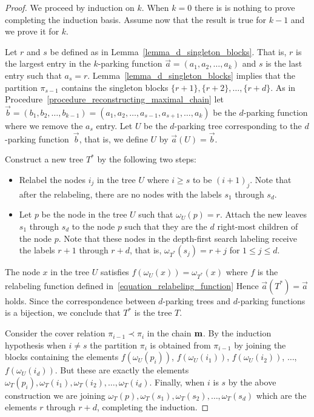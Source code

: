 \documentclass[11pt]{amsart}
\numberwithin{equation}{section}
\newcommand{\coveredby}{\prec}
\begin{document}
\begin{proof}
We proceed by induction on $k$.
When $k=0$ there is is nothing to prove completing the induction basis.
Assume now that the result is true for $k-1$ and we prove it for $k$.


Let $r$ and $s$ be defined
as in Lemma~\ref{lemma_d_singleton_blocks}.
That is, $r$ is the largest entry in the $k$-parking function $\vec{a} = (a_{1},a_{2}, \ldots, a_{k})$
and $s$ is the last entry such that $a_{s} = r$.
Lemma~\ref{lemma_d_singleton_blocks} implies that
the partition $\pi_{s-1}$ contains the singleton blocks
$\{r+1\}, \{r+2\}, \ldots, \{r+d\}$.
As in Procedure~\ref{procedure_reconstructing_maximal_chain}
let $\vec{b} = (b_{1}, b_{2}, \ldots, b_{k-1}) = (a_{1}, a_{2}, \ldots, a_{s-1}, a_{s+1}, \ldots, a_{k})$
be the $d$-parking function where we remove the $a_{s}$ entry.
Let $U$ be the $d$-parking tree corresponding to the $d$-parking function~$\vec{b}$,
that is, we define $U$ by $\vec{a}(U) = \vec{b}$.



Construct a new tree $T^{*}$ by the following two steps:
\begin{itemize}
\item[(1)]
Relabel the nodes $i_{j}$ in the tree $U$ where $i \geq s$ to be $(i+1)_{j}$.
Note that after the relabeling, there are no nodes with the labels $s_{1}$ through $s_{d}$.
\item[(2)]
Let $p$ be the node in the tree $U$ such that $\omega_{U}(p) = r$.
Attach the new leaves $s_{1}$ through $s_{d}$ to the node $p$
such that they are the $d$ right-most children of the node $p$.
Note that these nodes in the depth-first search labeling
receive the labels $r+1$ through $r+d$, that is,
$\omega_{T^{*}}(s_{j}) = r+j$ for $1 \leq j \leq d$.
\end{itemize}
The node $x$ in the tree $U$ satisfies
$f(\omega_{U}(x)) = \omega_{T^{*}}(x)$ where $f$ is the relabeling function
defined in~\eqref{equation_relabeling_function}
Hence $\vec{a}(T^{*}) = \vec{a}$ holds.
Since the correspondence between $d$-parking trees and $d$-parking functions
is a bijection, we conclude that $T^{*}$ is the tree $T$.


Consider the cover relation $\pi_{i-1} \coveredby \pi_{i}$
in the chain ${\bf m}$.
By the induction hypothesis
when $i \neq s$
the partition $\pi_{i}$ is obtained from $\pi_{i-1}$ by joining the blocks containing the elements
$f(\omega_{U}(p_{i}))$, $f(\omega_{U}(i_{1}))$, $f(\omega_{U}(i_{2}))$, $\ldots$, $f(\omega_{U}(i_{d}))$.
But these are exactly the elements
$\omega_{T}(p_{i}), \omega_{T}(i_{1}), \omega_{T}(i_{2}), \ldots, \omega_{T}(i_{d})$.
Finally, when $i$ is $s$ by the above construction we are joining
$\omega_{T}(p), \omega_{T}(s_{1}), \omega_{T}(s_{2}), \ldots, \omega_{T}(s_{d})$
which are the elements $r$ through $r+d$, completing the induction.
\end{proof}
\end{document}
